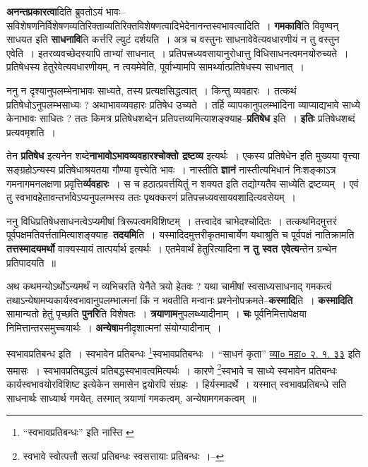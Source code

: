 \documentclass[article,12pt,a4paper]{memoir}
\begin{document}
	  \endgroup
	

	  \pstart \textbf{अनन्तप्रकारत्वा}दिति ब्रुवतोऽयं भावः--सविशेषणनिर्विशेषणव्यतिरिक्ताव्यतिरिक्तविशेषणत्वादिभेदेनानन्तस्वभावत्वादिति । \textbf{गमकावि}ति विवृण्वन् साधयत इति \textbf{साधनावि}ति कर्त्तरि ल्युटं दर्शयति । अत्र च वस्तुनः साधनावेवेत्यवधारणीयं न तु वस्तुन एवेति । इतरव्यवच्छेदस्यापि ताभ्यां साधनात् । प्रतिपत्त्रध्यवसायानुरोधात्तु विधिसाधनत्वमनयोरुच्यते । प्रतिषेधस्य हेतुरेवेत्यवधारणीयम्, न त्वयमेवेति, पूर्वाभ्यामपि सामर्थ्यात्प्रतिषेधस्य साधनात् ।
	\pend
      

	  \pstart ननु न दृश्यानुपलम्भेनाभावः साध्यते, तस्य प्रत्यक्षसिद्धत्वात् । किन्तु व्यवहारः । तत्कथं प्रतिषेधोऽनुपलम्भसाध्यः ? अथाभावव्यवहारः प्रतिषेध उच्यते । तर्हि व्यापकानुपलम्भादिना व्याप्याद्यभावे साध्ये केनाभावः साधितः ? ततः किमत्र प्रतिषेधशब्देन प्रतिपत्तव्यमित्याशङ्क्याह--\textbf{प्रतिषेध} इति । \textbf{इतिः} प्रतिषेधशब्दं प्रत्यवमृशति ।
	\pend
      

	  \pstart तेन \textbf{प्रतिषेध} इत्यनेन शब्दे\textbf{नाभावोऽभावव्यवहारश्चोक्तो द्रष्टव्य} इत्यर्थः । एकस्य प्रतिषेधेन इति मुख्यया वृत्त्या सङ्ग्रहोऽन्यस्य प्रतिषेधाश्रयतया गौण्या वृत्त्येति भावः । नास्तीति \textbf{ज्ञानं} नास्तीत्यभिधानं निःशङ्काऽत्र गमनागमनलक्षणा प्रवृत्ति\textbf{र्व्यवहारः} । स च हठात्प्रवर्त्तयितुं न शक्यत इति तद्योग्यतैव साध्येति द्रष्टव्यम् । एवं तु स्वभावहेतावन्तर्भावेऽप्यनुपलम्भस्य ततः पृथक्करणं प्रतिपत्त्रध्यवसायवशादित्यवसेयम् ।
	\pend
      

	  \pstart ननु विधिप्रतिषेधसाधनत्वेऽप्यमीषां त्रिरूपत्वमविशिष्टम् । तत्त्वादेव चाभेदश्चोदितः । तत्कथमिदमुत्तरं पूर्वपक्षमतिवर्त्ततामित्याशङ्क्याह--\textbf{तदयमि}ति । यस्मादिदमुत्तरीकृतमाचार्येण यथाश्रुति च पूर्वपक्षं नातिक्रामति \textbf{तत्तस्मादयमर्थो} वाक्यस्यायं तात्पर्यार्थ इत्यर्थः । एतमेवार्थं हेतुरित्यादिना \textbf{न तु स्वत एवेत्य}न्तेन ग्रन्थेन प्रतिपादयति ॥
	\pend
      

	  \pstart अथ कथमन्योऽर्थोऽन्यमर्थं न व्यभिचरति येनैते त्रयो हेतवः ? य\leavevmode{}था चामीषां स्वसाध्यसाधनाद् गमकत्वं तथाऽन्येषामप्यकार्यस्वभावानुपलम्भात्मनां किं न भवतीति मन्वानः प्रश्नेनोपक्रमते--\textbf{कस्मादि}ति । \textbf{कस्मादिति} सामान्यतो हेतुं पृच्छति \textbf{पुनरि}ति विशेषतः । \textbf{त्रयाणाम}नुपलब्ध्यादीनाम् । \textbf{चः} पूर्वनिमित्तापेक्षया निमित्तान्तरसमुच्चयार्थः । \textbf{अन्येषा}मनीदृशात्मनां संयोग्यादीनाम् ।
	\pend
	  \bigskip
	  \begingroup
	

	  \pstart स्वभावप्रतिबन्ध इति । स्वभावेन प्रतिबन्धः \footnote{“स्वभावप्रतिबन्धः” इति नास्ति \cite{dp-msC}}\-स्वभावप्रतिबन्धः । “साधनं कृता” \href{http://http://sarit.indology.info/?cref=vk-mbh.2.1.33}{व्या०
	    महा० २. १. ३३} इति समासः । स्वभावप्रतिबद्धत्वं प्रतिबद्धस्वभावत्वमित्यर्थः । कारणे \footnote{स्वभावे स्वोत्पत्तौ सत्यां प्रतिबन्धः स्वसत्तायाः प्रतिबन्धः ।--\cite{dp-msD-n}}\-स्वभावे च साध्ये स्वभावेन प्रतिबन्धः कार्यस्वभावयोरविशिष्ट इत्येकेन समासेन द्वयोरपि संग्रहः । हिर्यस्मादर्थे । यस्मात् स्वभावप्रतिबन्धे सति साधनार्थः साध्यार्थ गमयेत्, तस्मात् त्रयाणां गमकत्वम्, अन्येषामगमकत्वम् ॥
	\pend
       
\end{document}
